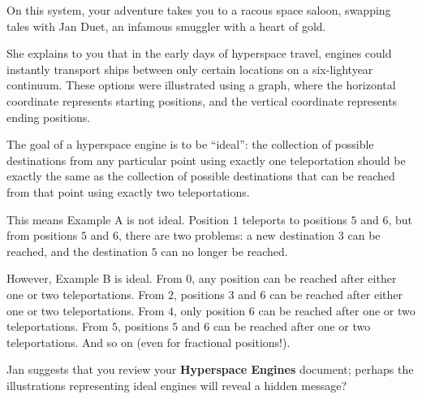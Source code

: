 On this system, your adventure takes you to a racous space saloon, swapping tales
with Jan Duet, an infamous smuggler with a heart of gold.

She explains to you that in the early days of hyperspace travel, engines could
instantly transport ships between only certain locations on a six-lightyear continuum.
These options were illustrated using a graph, where the horizontal coordinate
represents starting positions, and the vertical coordinate represents ending positions.


The goal of a hyperspace engine is to be ``ideal'': the collection of possible
destinations from any particular point using exactly one teleportation should be exactly the 
same as the collection of possible destinations that can
be reached from that point using exactly two teleportations.

This means Example A is not ideal. Position \(1\) teleports to
positions \(5\) and \(6\), but from positions \(5\) and \(6\), there are two
problems: a new destination \(3\) can be reached, and the destination \(5\) can
no longer be reached.

However, Example B is ideal. From \(0\), any position can be reached after either
one or two teleportations. From \(2\), positions \(3\) and \(6\) can be reached
after either one or two teleportations. From \(4\), only position \(6\) can be reached
after one or two teleportations. From \(5\), positions \(5\) and \(6\) can be
reached after one or two teleportations. And so on (even for fractional positions!).

Jan suggests that you review your \textbf{Hyperspace Engines} document;
perhaps the illustrations representing ideal engines will reveal a hidden message?

